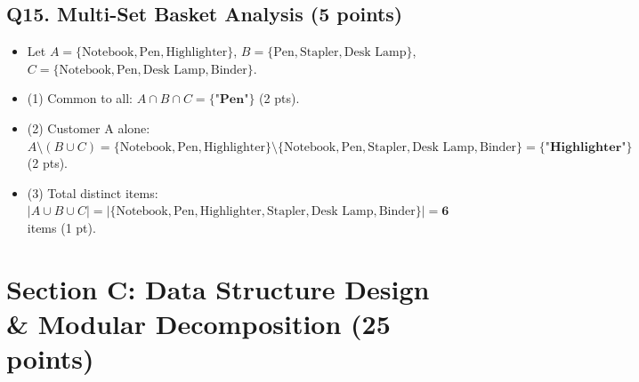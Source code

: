 \documentclass[11pt,a4paper]{article}
\begin{document}
\subsection*{Q15. Multi-Set Basket Analysis (5 points)}
\begin{itemize}
\item Let $A = \{\text{Notebook}, \text{Pen}, \text{Highlighter}\}$, $B = \{\text{Pen}, \text{Stapler}, \text{Desk Lamp}\}$, $C = \{\text{Notebook}, \text{Pen}, \text{Desk Lamp}, \text{Binder}\}$.
\item (1) Common to all: $A \cap B \cap C = \mathbf{\{\text{"Pen"}\}}$ (2 pts).
\item (2) Customer A alone: $A \setminus (B \cup C) = \{\text{Notebook}, \text{Pen}, \text{Highlighter}\} \setminus \{\text{Notebook}, \text{Pen}, \text{Stapler}, \text{Desk Lamp}, \text{Binder}\} = \mathbf{\{\text{"Highlighter"}\}}$ (2 pts).
\item (3) Total distinct items: $|A \cup B \cup C| = |\{\text{Notebook}, \text{Pen}, \text{Highlighter}, \text{Stapler}, \text{Desk Lamp}, \text{Binder}\}| = \mathbf{6}$ items (1 pt).
\end{itemize}

\newpage
\section*{Section C: Data Structure Design \& Modular Decomposition (25 points)}
\end{document}
